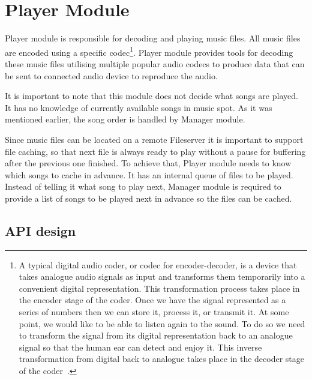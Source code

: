 \section{Player Module}

Player module is responsible for decoding and playing music files. All music files are encoded using a specific codec\footnote{A typical digital audio coder, or codec for encoder-decoder, is a device that takes analogue audio signals as input and transforms them temporarily into a convenient digital representation. This transformation process takes place in the encoder stage of the coder. Once we have the signal represented as a series of numbers then we can store it, process it, or transmit it. At some point, we would like to be able to listen again to the sound. To do so we need to transform the signal from its digital representation back to an analogue signal so that the human ear can detect and enjoy it. This inverse transformation from digital back to analogue takes place in the decoder stage of the coder~\citep{IntroToDigitalAudio}.}. Player module provides tools for decoding these music files utilising multiple popular audio codecs to produce data that can be sent to connected audio device to reproduce the audio.
\par
It is important to note that this module does not decide what songs are played. It has no knowledge of currently available songs in music spot. As it was mentioned earlier, the song order is handled by Manager module.
\par
Since music files can be located on a remote Fileserver it is important to support file caching, so that next file is always ready to play without a pause for buffering after the previous one finished. To achieve that, Player module needs to know which songs to cache in advance. It has an internal queue of files to be played. Instead of telling it what song to play next, Manager module is required to provide a list of songs to be played next in advance so the files can be cached.

\subsection{API design}

